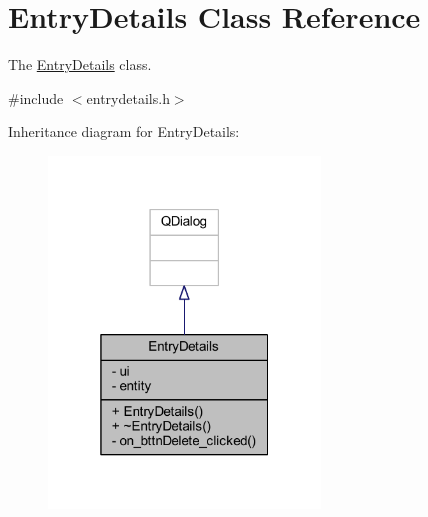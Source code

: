 \hypertarget{class_entry_details}{\section{Entry\+Details Class Reference}
\label{class_entry_details}
}


The \hyperlink{class_entry_details}{Entry\+Details} class.  




{\ttfamily \#include $<$entrydetails.\+h$>$}



Inheritance diagram for Entry\+Details\+:
\nopagebreak
\begin{figure}[H]
\begin{center}
\leavevmode
\includegraphics[width=205pt]{class_entry_details__inherit__graph}
\end{center}
\end{figure}


